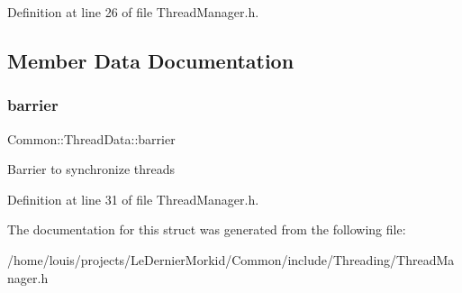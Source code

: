 Definition at line 26 of file Thread\+Manager.\+h.



\subsection{Member Data Documentation}
\mbox{\label{struct_common_1_1_thread_data_a75375da6d1b9c59ba64b9fb784b4f326}} 
\subsubsection{\texorpdfstring{barrier}{barrier}}
{\footnotesize\ttfamily Common\+::\+Thread\+Data\+::barrier}

Barrier to synchronize threads 

Definition at line 31 of file Thread\+Manager.\+h.



The documentation for this struct was generated from the following file\+:\begin{DoxyCompactItemize}
\item 
/home/louis/projects/\+Le\+Dernier\+Morkid/\+Common/include/\+Threading/Thread\+Manager.\+h\end{DoxyCompactItemize}

